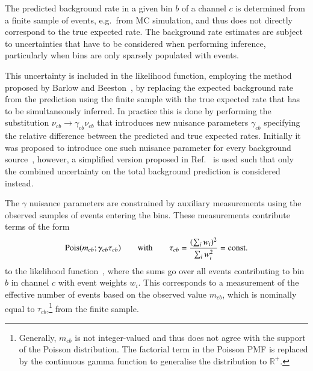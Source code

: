 The predicted background rate in a given bin $b$ of a channel $c$ is determined
from a finite sample of events, e.g.\ from MC simulation, and thus does not
directly correspond to the true expected rate. The background rate estimates are
subject to uncertainties that have to be considered when performing inference,
particularly when bins are only sparsely populated with events.

This uncertainty is included in the likelihood function, employing the method
proposed by Barlow and Beeston~\cite{barlow1993}, by replacing the expected
background rate from the prediction using the finite sample with the true
expected rate that has to be simultaneously inferred. In practice this is done
by performing the substitution $\nu_{cb} \rightarrow \gamma_{cb} \nu_{cb}$ that
introduces new nuisance parameters $\gamma_{cb}$ specifying the relative
difference between the predicted and true expected rates. Initially it was
proposed to introduce one such nuisance parameter for every background
source~\cite{barlow1993}, however, a simplified version proposed in
Ref.~\cite{conway2011} is used such that only the combined uncertainty on the
total background prediction is considered instead.

The $\gamma$ nuisance parameters are constrained by auxiliary measurements using
the observed samples of events entering the bins. These measurements contribute
terms of the form
\begin{align*}
  \operatorname{Pois}(m_{cb} ; \gamma_{cb} \tau_{cb})
  \qquad \text{with} \qquad
  \tau_{cb} = \frac{( \sum_i w_i )^2}{\sum_i w_i^2} = \text{const.}
\end{align*}
to the likelihood function~\cite{cranmer2012}, where the sums go over all events
contributing to bin $b$ in channel $c$ with event weights $w_i$. This
corresponds to a measurement of the effective number of events based on the
observed value $m_{cb}$, which is nominally equal to
$\tau_{cb}$,\footnote{Generally, $m_{cb}$ is not integer-valued and thus does
  not agree with the support of the Poisson distribution. The factorial term in
  the Poisson PMF is replaced by the continuous gamma function to generalise the
  distribution to $\mathbb{R}^+$.} from the finite sample.

